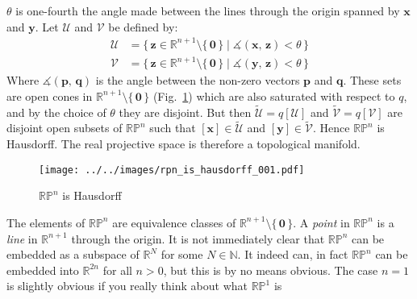 \documentclass{article}
\theoremstyle{plain}
\theoremstyle{normal}
\newenvironment{example}{%
    \pushQED{\qed}\renewcommand{\qedsymbol}{$\blacksquare$}\examplex%
}{%
    \popQED\endexamplex%
}
\begin{document}
\begin{example}[\textbf{Real Projective Space}]
            $\theta$ is one-fourth the angle made between the lines through
            the origin spanned by $\mathbf{x}$ and $\mathbf{y}$. Let
            $\mathcal{U}$ and $\mathcal{V}$ be defined by:
            \begin{align}
                \mathcal{U}
                &=\big\{\,
                    \mathbf{z}\in\mathbb{R}^{n+1}\setminus\{\,\mathbf{0}\,\}
                        \;|\;\measuredangle(\mathbf{x},\,\mathbf{z})<\theta\,
                    \big\}\\
                \mathcal{V}
                &=\big\{\,
                    \mathbf{z}\in\mathbb{R}^{n+1}\setminus\{\,\mathbf{0}\,\}
                        \;|\;\measuredangle(\mathbf{y},\,\mathbf{z})<\theta\,
                    \big\}
            \end{align}
            Where $\measuredangle(\mathbf{p},\,\mathbf{q})$ is the angle
            between the non-zero vectors $\mathbf{p}$ and $\mathbf{q}$. These
            sets are open cones in
            $\mathbb{R}^{n+1}\setminus\{\,\mathbf{0}\,\}$
            (Fig.~\ref{fig:rpn_is_hausdorff_001}) which are also
            saturated with respect to $q$, and by the choice of $\theta$ they
            are disjoint. But then $\tilde{\mathcal{U}}=q[\mathcal{U}]$ and
            $\tilde{\mathcal{V}}=q[\mathcal{V}]$ are disjoint open subsets of
            $\mathbb{RP}^{n}$ such that
            $[\mathbf{x}]\in\tilde{\mathcal{U}}$ and
            $[\mathbf{y}]\in\tilde{\mathcal{V}}$. Hence $\mathbb{RP}^{n}$ is
            Hausdorff. The real projective space is therefore a topological
            manifold.
        \end{example}
        \begin{figure}
            \centering
            \texttt{[image: ../../images/rpn\_is\_hausdorff\_001.pdf]}
            \caption{$\mathbb{RP}^{n}$ is Hausdorff}
            \label{fig:rpn_is_hausdorff_001}
        \end{figure}
        The elements of $\mathbb{RP}^{n}$ are equivalence classes of
        $\mathbb{R}^{n+1}\setminus\{\,\mathbf{0}\,\}$. A
        \textit{point} in $\mathbb{RP}^{n}$ is a \textit{line} in
        $\mathbb{R}^{n+1}$ through the origin. It is not immediately clear that
        $\mathbb{RP}^{n}$ can be embedded as a subspace of $\mathbb{R}^{N}$ for
        some $N\in\mathbb{N}$. It indeed can, in fact
        $\mathbb{RP}^{n}$ can be embedded into $\mathbb{R}^{2n}$ for all $n>0$,
        but this is by no means obvious. The case $n=1$ is slightly obvious if
        you really think about what $\mathbb{RP}^{1}$ is
\end{document}
